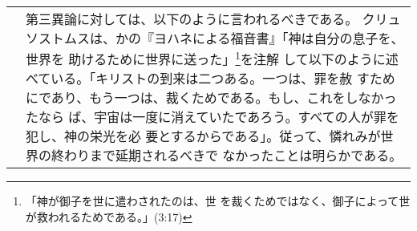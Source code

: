 \documentclass[10pt]{jsarticle} %
\begin{document}
\begin{longtable}{p{21em}p{21em}}
&

第三異論に対しては、以下のように言われるべきである。
クリュソストムスは、かの『ヨハネによる福音書』「神は自分の息子を、世界を
 助けるために世界に送った」\footnote{「神が御子を世に遣わされたのは、世
 を裁くためではなく、御子によって世が救われるためである。」(3:17)}を注解
 して以下のように述べている。「キリストの到来は二つある。一つは、罪を赦
 すためにであり、もう一つは、裁くためである。もし、これをしなかったなら
 ば、宇宙は一度に消えていたであろう。すべての人が罪を犯し、神の栄光を必
 要とするからである」。従って、憐れみが世界の終わりまで延期されるべきで
 なかったことは明らかである。





\end{longtable}
\end{document}
